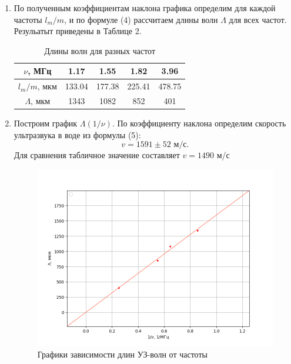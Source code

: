 \documentclass{article}
\begin{document}
\begin{enumerate}
 \item  По полученным коэффициентам наклона графика определим для каждой частоты $l_m/m$, и по формуле (4) рассчитаем длины волн $\Lambda$ для всех частот. Резульатыт приведены в Таблице 2.
 \begin{table}[h!]
\centering
\begin{tabular}{|c|c|c|c|c|}
\hline
$\nu$, МГц     & \textbf{1.17} & \textbf{1.55} & \textbf{1.82} & 3.96   \\ \hline
$l_m/m$, мкм   & 133.04        & 177.38        & 225.41        & 478.75 \\ \hline
$\Lambda$, мкм & 1343          & 1082          & 852           & 401    \\ \hline
\end{tabular}
\caption{Длины волн для разных частот}
\label{tab:my-table}
\end{table}
\item	Построим график $\Lambda(1/\nu)$. По коэффициенту наклона определим скорость ультразвука в воде из формулы (5):
	$$v=1591\pm52\text{ м/с}.$$
Для сравнения табличное значение составляет $v=1490$ м/с
  \begin{figure}[h!]
	\includegraphics[scale=0.7]{Figure_2!.png}
	\centering
	\caption{Графики зависимости длин УЗ-волн от частоты }
\end{figure}	


\end{enumerate}
\newpage
\end{document}
